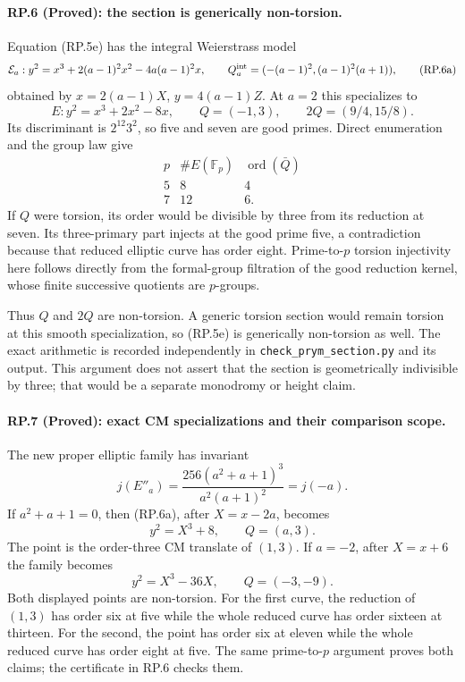 \paragraph{RP.6 (Proved): the section is generically non-torsion.}
Equation (RP.5e) has the integral Weierstrass model
\[
 \mathcal E_a:
 y^2=x^3+2(a-1)^2x^2-4a(a-1)^2x,
 \qquad
 Q_a^{\rm int}=(-(a-1)^2,(a-1)^2(a+1)),
 \tag{RP.6a}
\]
obtained by $x=2(a-1)X$, $y=4(a-1)Z$.
At $a=2$ this specializes to
\[
 E:y^2=x^3+2x^2-8x,\qquad Q=(-1,3),\qquad
                    2Q=(9/4,15/8).
\]
Its discriminant is $2^{12}3^2$, so five and seven
are good primes. Direct enumeration and the group
law give
\[
\begin{array}{c|cc}
 p&\#E(\mathbb F_p)&\operatorname{ord}(\bar Q)\\ \hline
 5&8&4\\
 7&12&6.
\end{array}
 \tag{RP.6b}
\]
If $Q$ were torsion, its order would be divisible
by three from its reduction at seven. Its
three-primary part injects at the good prime
five, a contradiction because that reduced
elliptic curve has order eight. Prime-to-$p$
torsion injectivity here follows directly from
the formal-group filtration of the good
reduction kernel, whose finite successive
quotients are $p$-groups.

Thus $Q$ and $2Q$ are non-torsion. A generic
torsion section would remain torsion at this
smooth specialization, so (RP.5e) is generically
non-torsion as well. The exact arithmetic is
recorded independently in
\texttt{check\_prym\_section.py} and its output.
This argument does not assert that the section
is geometrically indivisible by three; that
would be a separate monodromy or height claim.

\paragraph{RP.7 (Proved): exact CM specializations and their comparison scope.}
The new proper elliptic family has invariant
\[
             j(E''_a)=
       \frac{256(a^2+a+1)^3}{a^2(a+1)^2}=j(-a).
\]
If $a^2+a+1=0$, then (RP.6a), after $X=x-2a$,
becomes
\[
                 y^2=X^3+8,\qquad Q=(a,3).
 \tag{RP.7a}
\]
The point is the order-three CM translate of
$(1,3)$. If $a=-2$, after $X=x+6$ the family becomes
\[
                 y^2=X^3-36X,\qquad Q=(-3,-9).
 \tag{RP.7b}
\]
Both displayed points are non-torsion. For the
first curve, the reduction of $(1,3)$ has order
six at five while the whole reduced curve has
order sixteen at thirteen. For the second,
the point has order six at eleven while the
whole reduced curve has order eight at five.
The same prime-to-$p$ argument proves both
claims; the certificate in RP.6 checks them.

